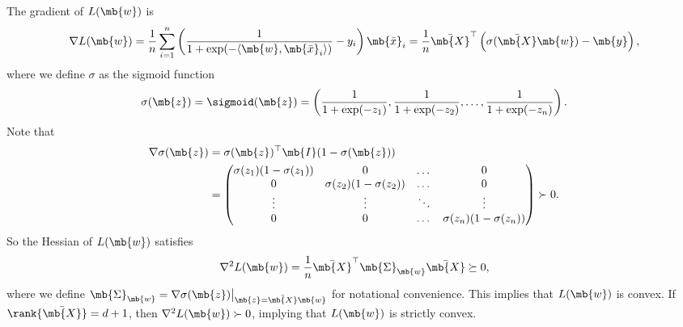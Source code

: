 \begin{exercise}
\begin{enumerate}
            \begin{solution}
                The gradient of $L(\mb{w})$ is
                \begin{align*}
                    \nabla L(\mb{w}) = \frac{1}{n}\sum_{i=1}^n \left( \frac{1}{1+\exp(-\langle \mb{w}, \mb{\bar{x}}_i\rangle)} - y_i \right) \mb{\bar{x}}_i = \frac{1}{n} \bar{\mb{X}}^\top \left( \sigma(\bar{\mb{X}}\mb{w}) - \mb{y} \right),
                \end{align*}
                where we define $\sigma$ as the sigmoid function
                \begin{align*}
                    \sigma(\mb{z}) = \sigmoid(\mb{z}) = \left(\frac{1}{1+\exp(-z_1)},\frac{1}{1+\exp(-z_2)},\dots,\frac{1}{1+\exp(-z_n)}\right).
                \end{align*}
                Note that
                \begin{align*}
                    \nabla \sigma(\mb{z}) & = \sigma(\mb{z})^\top \mb{I} (1-\sigma(\mb{z})) \\
                                          & =
                    \begin{pmatrix}
                        \sigma(z_1) (1-\sigma(z_1)) & 0                           & \dots  & 0                           \\
                        0                           & \sigma(z_2) (1-\sigma(z_2)) & \dots  & 0                           \\
                        \vdots                      & \vdots                      & \ddots & \vdots                      \\
                        0                           & 0                           & \dots  & \sigma(z_n) (1-\sigma(z_n))
                    \end{pmatrix}
                    \succ 0.
                \end{align*}
                So the Hessian of $L(\mb{w})$ satisfies
                \begin{align*}
                    \nabla^2 L(\mb{w}) = \frac{1}{n} \bar{\mb{X}}^\top \mb{\Sigma}_\mb{w} \bar{\mb{X}} \succeq 0,
                \end{align*}
                where we define $\mb{\Sigma}_\mb{w} = \nabla \sigma(\mb{z}) \big |_{\mb{z}=\bar{\mb{X}}\mb{w}}$ for notational convenience. This implies that $L(\mb{w})$ is convex. If $\rank{\bar{\mb{X}}}=d+1$, then $\nabla^2 L(\mb{w}) \succ 0$, implying that $L(\mb{w})$ is strictly convex.
                \qedhere

\end{solution}
\end{enumerate}
\end{exercise}
